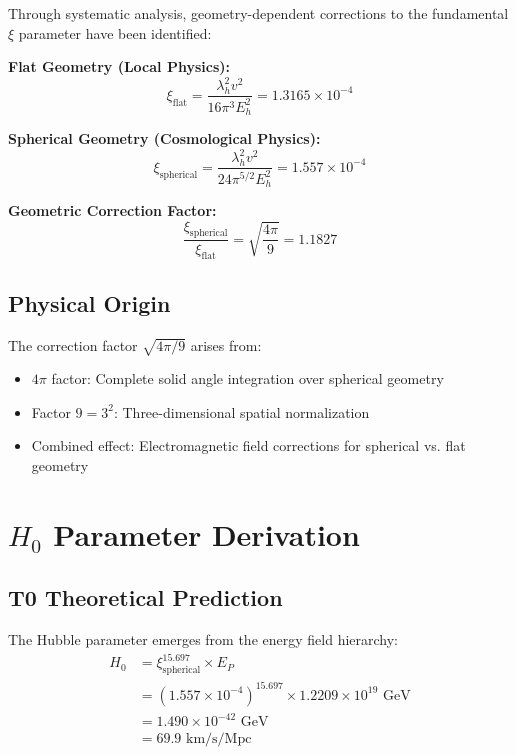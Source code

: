 \documentclass[12pt,a4paper]{article}
\begin{document}
	Through systematic analysis, geometry-dependent corrections to the fundamental $\xi$ parameter have been identified:
	
	\begin{tcolorbox}[colback=blue!5!white,colframe=blue!75!black,title=Geometry-Dependent $\xi$ Parameters]
		\textbf{Flat Geometry (Local Physics):}
		\begin{equation}
			\xi_{\text{flat}} = \frac{\lambda_h^2 v^2}{16\pi^3 E_h^2} = 1.3165 \times 10^{-4}
		\end{equation}
		
		\textbf{Spherical Geometry (Cosmological Physics):}
		\begin{equation}
			\xi_{\text{spherical}} = \frac{\lambda_h^2 v^2}{24\pi^{5/2} E_h^2} = 1.557 \times 10^{-4}
		\end{equation}
		
		\textbf{Geometric Correction Factor:}
		\begin{equation}
			\frac{\xi_{\text{spherical}}}{\xi_{\text{flat}}} = \sqrt{\frac{4\pi}{9}} = 1.1827
		\end{equation}
	\end{tcolorbox}
	
	\subsection{Physical Origin}
	The correction factor $\sqrt{4\pi/9}$ arises from:
	\begin{itemize}
		\item $4\pi$ factor: Complete solid angle integration over spherical geometry
		\item Factor $9 = 3^2$: Three-dimensional spatial normalization
		\item Combined effect: Electromagnetic field corrections for spherical vs. flat geometry
	\end{itemize}
	
	\section{$H_0$ Parameter Derivation}
	
	\subsection{T0 Theoretical Prediction}
	The Hubble parameter emerges from the energy field hierarchy:
	\begin{align}
		H_0 &= \xi_{\text{spherical}}^{15.697} \times E_P \\
		&= (1.557 \times 10^{-4})^{15.697} \times 1.2209 \times 10^{19} \text{ GeV} \\
		&= 1.490 \times 10^{-42} \text{ GeV} \\
		&= \boxed{69.9 \text{ km/s/Mpc}}
	\end{align}
	
\end{document}
